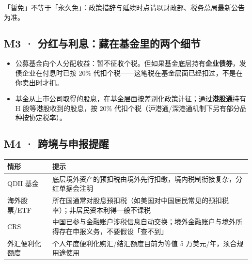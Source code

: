 \documentclass[a4paper,11pt,oneside,fontset=none,UTF8,zihao=-4]{ctexbook}
\providecommand{\tightlist}{\setlength{\itemsep}{2pt}\setlength{\parskip}{1pt}}
\begin{document}
\begin{dhquote}
「暂免」不等于「永久免」：政策措辞与延续时点请以财政部、税务总局最新公告为准。
\end{dhquote}

\subsection{M3 ·
分红与利息：藏在基金里的两个细节}\label{m3-ux5206ux7ea2ux4e0eux5229ux606fux85cfux5728ux57faux91d1ux91ccux7684ux4e24ux4e2aux7ec6ux8282}

\begin{itemize}
\tightlist
\item
  公募基金向个人分配收益：暂不征收个税。但如果基金底层持有\textbf{企业债券}，发债企业在付息时已按
  20\% 代扣个税------这笔税在基金层面已经扣过，不是在你卖出时才扣。
\item
  基金从上市公司取得的股息，在基金层面按差别化政策计征；通过\textbf{港股通}持有
  H 股等港股收到的股息，按 20\%
  代扣个税（沪港通/深港通机制下另有部分品种按协定税率）。
\end{itemize}

\subsection{M4 ·
跨境与申报提醒}\label{m4-ux8de8ux5883ux4e0eux7533ux62a5ux63d0ux9192}

\begin{longtable}[]{@{}
  >{\raggedright\arraybackslash}p{}
  >{\raggedright\arraybackslash}p{}@{}}
\toprule\noalign{}\rowcolor{dh-pink!25}
\begin{minipage}[b]{\linewidth}\raggedright
情形
\end{minipage} & \begin{minipage}[b]{\linewidth}\raggedright
提示
\end{minipage} \\
\midrule\noalign{}
\endhead
\bottomrule\noalign{}
\endlastfoot
QDII 基金 &
底层境外资产的预扣税由境外先行扣缴，境内税制衔接复杂，分红单据会注明 \\
海外股票/ETF &
所在国通常对股息预扣税（如美国对中国居民常见的预扣税率）；非居民资本利得一般不课税 \\
CRS &
中国已参与金融账户涉税信息自动交换；境外金融账户与境外所得存在申报义务，不要假设「查不到」 \\
外汇便利化额度 & 个人年度便利化购汇/结汇额度目前为等值 5
万美元/年，须合规用途使用 \\
\end{longtable}
\end{document}
